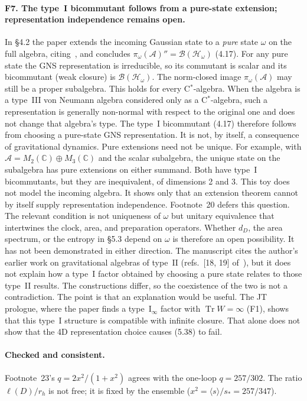 \documentclass[11pt]{article}
\theoremstyle{remark}
\newcommand{\Tr}{\operatorname{Tr}}
\begin{document}
\paragraph{F7. The type~I bicommutant follows from a pure-state extension; representation independence remains open.}
In \S4.2 the paper extends the incoming Gaussian state to a \emph{pure} state $\omega$
on the full algebra, citing~\cite{KS}, and concludes
$\pi_\omega(\mathcal A)''=\mathcal B(\mathcal H_\omega)$ (4.17). For any pure state the
GNS representation is irreducible, so its commutant is scalar and its bicommutant (weak
closure) is $\mathcal B(\mathcal H_\omega)$. The norm-closed image $\pi_\omega(\mathcal A)$
may still be a proper subalgebra. This holds for every C$^*$-algebra. When the algebra is
a type~III von Neumann algebra considered only as a C$^*$-algebra, such a representation
is generally non-normal with respect to the original one and does not change that
algebra's type. The type~I bicommutant (4.17) therefore follows from choosing a pure-state
GNS representation. It is not, by itself, a consequence of gravitational dynamics. Pure
extensions need not be unique. For example, with $\mathcal A=M_2(\mathbb C)\oplus
M_3(\mathbb C)$ and the scalar subalgebra, the unique state on the subalgebra has pure
extensions on either summand. Both have type~I bicommutants, but they are inequivalent,
of dimensions 2 and 3. This toy does not model the incoming algebra. It shows only that
an extension theorem cannot by itself supply representation independence. Footnote~20
defers this question. The relevant condition is not uniqueness of $\omega$ but unitary
equivalence that intertwines the clock, area, and preparation operators. Whether $d_D$, the area spectrum, or the entropy in \S5.3
depend on $\omega$ is therefore an open possibility. It has not been demonstrated in
either direction. The manuscript cites the author's earlier work on gravitational algebras of
type~II (refs.~[18, 19] of~\cite{VC}), but it does not explain how a type~I factor obtained by choosing a pure
state relates to those type~II results. The constructions differ, so the coexistence of
the two is not a contradiction. The point is that an explanation would be useful. The JT prologue, where the paper finds a
type~I$_\infty$ factor with $\Tr W=\infty$ (F1), shows that this type~I structure is
compatible with infinite closure. That alone does not show that the 4D representation
choice causes (5.38) to fail.

\paragraph{Checked and consistent.} Footnote~23's $q=2x^2/(1+x^2)$ agrees with the
one-loop $q=257/302$. The ratio $\ell(D)/r_h$ is not free; it is fixed by the ensemble
($x^2=\langle s\rangle/s_*=257/347$).
\end{document}
